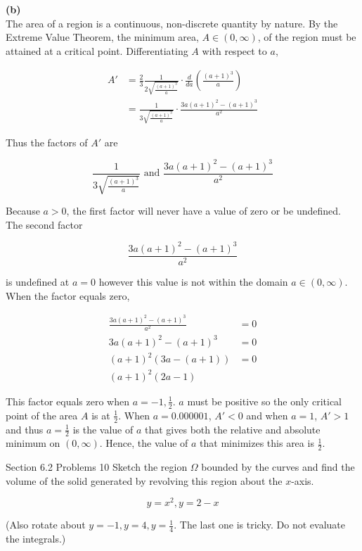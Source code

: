 \documentclass{article}
\begin{document}
    \pagebreak
    \thispagestyle{7}

    \textbf{(b)} \\
    The area of a region is a continuous, non-discrete quantity by nature. By the Extreme Value Theorem, the minimum area, $A\in(0,\infty)$, of the region must be attained at a critical point. Differentiating $A$ with
    respect to $a$,

    \begin{align*}
        A'  &= \frac{2}{3} \frac{1}{2\sqrt{\frac{(a+1)^3}{a}}} \cdot \frac{d}{da}\left(\frac{(a+1)^3}{a}\right) \\
            &= \frac{1}{3\sqrt{\frac{(a+1)^3}{a}}}\cdot \frac{3a(a+1)^2 - (a+1)^3}{a^2}
    \end{align*}

    Thus the factors of $A'$ are

    \[
        \frac{1}{3\sqrt{\frac{(a+1)^3}{a}}} \text{ and } \frac{3a(a+1)^2-(a+1)^3}{a^2}
    \]

    Because $a>0$, the first factor will never have a value of zero or be undefined. The second factor

    \[
        \frac{3a(a+1)^2-(a+1)^3}{a^2}
    \]

    is undefined at $a=0$ however this value is not within the domain $a\in(0,\infty)$. When the factor equals zero,

    \begin{align*}
        \frac{3a(a+1)^2-(a+1)^3}{a^2}   &= 0 \\
        3a(a+1)^2 - (a+1)^3             &= 0 \\
        (a+1)^2(3a-(a+1))               &= 0 \\
        (a+1)^2(2a-1)
    \end{align*}

    This factor equals zero when $a=-1,\frac{1}{2}$. $a$ must be positive so the only critical point of the area $A$ is at $\frac{1}{2}$. When $a=0.000001$, $A'<0$ and when $a=1$, $A'>1$ and thus $a=\frac{1}{2}$ is
    the value of $a$ that gives both the relative and absolute minimum on $(0,\infty)$. Hence, the value of $a$ that minimizes this area is $\frac{1}{2}$.


    \begin{tbhtheorem}{Section 6.2 Problems 10}
        Sketch the region $\Omega$ bounded by the curves and find the volume of the solid generated by revolving this region about the $x$-axis.

        \[
            y = x^2, y = 2-x
        \]

        (Also rotate about $y=-1, y=4, y=\frac{1}{4}$. The last one is tricky. Do not evaluate the integrals.)
    \end{tbhtheorem}
    
\end{document}
